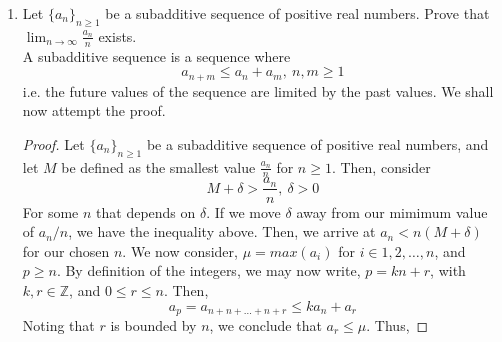 \documentclass[letterpaper,10pt]{article}
\newcommand{\Z}{\mathbb{Z}}
\begin{document}
\begin{enumerate}
\begin{enumerate}
\begin{proof}
\begin{align*}
&= c_1L(b_1)+\cdots+c_pL(b_p)+d_1L(e_1)+\cdots+d_qL(e_q) && \text{Also by linearity}\\
&=d_1L(e_1)+\cdots+d_qL(e_q) && \text{By definition of the kernel}
\end{align*}
So,
\[L(V)=\text{span}\{L(e_1),\ldots,L(e_q)\}\]
To show independence, we assume to the contrary that it is not. Then, by definition there are constants $d_i$ which are not all zero such that
\begin{align*}
0 &= d_1L(e_1)+\ldots+d_qL(e_q)\\
&=L(d_1e_1+\ldots+d_qe_q)
\end{align*}
But, from before, we defined $e_i$ to be linearly independent. So, $d_1e_1+\ldots+d_qe_q\neq 0$. Because $d_1e_1+\ldots+d_qe_q$ is not the zero vector, but still maps to zero, we know that $d_1e_1+\ldots+d_qe_q$ is in the kernel of $L$. Thus, from before, $d_1e_1+\ldots+d_qe_q$ is within the span of $\{b_1,\ldots,b_p\}$ as $b_i$ is a basis for the kernel. This means that $S$ is not a basis for $V$, a contradition. Thus, we conclude that $L(V)$ is linearally independent. So, dim$L(V)=q$. So, we have,
\begin{align*}
\text{dim}V &= \text{dim}[\text{ker}L]+\text{dim}L(V)\\
p+q &= (p)+(q)
\end{align*} 
As desired.
\end{proof}
\end{enumerate}
\newpage
\item Let $\{a_n\}_{n\geq 1}$ be a subadditive sequence of positive real numbers. Prove that $\lim_{n\to\infty}\frac{a_n}{n}$ exists.\\
A subadditive sequence is a sequence where 
\[a_{n+m}\leq a_n+a_m,\ n,m\geq 1\]
i.e. the future values of the sequence are limited by the past values. We shall now attempt the proof.
\begin{proof}
Let $\{a_n\}_{n\geq 1}$ be a subadditive sequence of positive real numbers, and let $M$ be defined as the smallest value $\frac{a_n}{n}$ for $n\geq 1$. Then, consider
\[M+\delta>\frac{a_n}{n},\ \delta>0\]
For some $n$ that depends on $\delta$. If we move $\delta$ away from our mimimum value of $a_n/n$, we have the inequality above. Then, we arrive at $a_n<n(M+\delta)$ for our chosen $n$. We now consider, $\mu=max(a_i)$ for $i\in 1,2,\ldots, n$, and $p\geq n$. By definition of the integers, we may now write, $p=kn+r$, with $k,r\in \Z$, and $0\leq r \leq n$. Then,
\[a_p = a_{n+n+\ldots+n+r}\leq ka_n+a_r\]
Noting that $r$ is bounded by $n$, we conclude that $a_r\leq \mu$. Thus,

\end{proof}
\end{enumerate}
\end{document}
